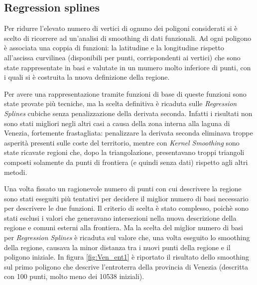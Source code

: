 \documentclass[a4paper,11pt,twoside,openright]{book}							%
\begin{document}
\subsection{Regression splines}

Per ridurre l'elevato numero di vertici di ognuno dei poligoni considerati si è scelto di ricorrere ad un'analisi di smoothing di dati funzionali. Ad ogni poligono è associata una coppia di funzioni: la latitudine e la longitudine rispetto all'ascissa curvilinea (disponibili per punti, corrispondenti ai vertici) che sono state rappresentate in basi e valutate in un mumero molto inferiore di punti, con i quali si è costruita la nuova definizione della regione.

Per avere una rappresentazione tramite funzioni di base di queste funzioni sono state provate più tecniche, ma la scelta definitiva è ricaduta sulle \textit{Regression Splines} cubiche senza penalizzazione della derivata seconda. Infatti i risultati non sono stati migliori negli altri casi a causa della zona interna alla laguna di Venezia, fortemente frastagliata: penalizzare la derivata seconda eliminava troppe asperità presenti sulle coste del territorio, mentre con \textit{Kernel Smoothing} sono state ricavate regioni che, dopo la triangolazione, presentavano troppi triangoli composti solamente da punti di frontiera (e quindi senza dati) rispetto agli altri metodi.

Una volta fissato un ragionevole numero di punti con cui descrivere la regione sono stati eseguiti più tentativi per decidere il miglior numero di basi necessario per descrivere le due funzioni. Il criterio di scelta è stato complesso, poichè sono stati esclusi i valori che generavano intersezioni nella nuova descrizione della regione e comuni esterni alla frontiera. Ma la scelta del miglior numero di basi per \textit{Regression Splines} è ricaduta sul valore che, una volta eseguito lo smoothing della regione, causava la minor distanza tra i nuovi punti della regione e il poligono iniziale. In figura \ref{fig:Ven_ent1} è riportato il risultato dello smoothing sul primo poligono che descrive l'entroterra della provincia di Venezia (descritta con 100 punti, molto meno dei 10538 iniziali).  
\end{document}
